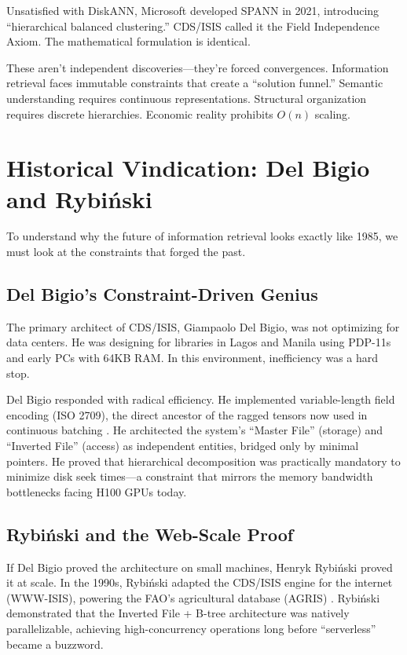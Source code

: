 \documentclass[manuscript,screen,review]{acmart}
\begin{document}
Unsatisfied with DiskANN, Microsoft developed SPANN in 2021, introducing ``hierarchical balanced clustering.'' CDS/ISIS called it the Field Independence Axiom. The mathematical formulation is identical.

These aren't independent discoveries---they're forced convergences. Information retrieval faces immutable constraints that create a ``solution funnel.'' Semantic understanding requires continuous representations. Structural organization requires discrete hierarchies. Economic reality prohibits $O(n)$ scaling.

\section{Historical Vindication: Del Bigio and Rybiński}

To understand why the future of information retrieval looks exactly like 1985, we must look at the constraints that forged the past.

\subsection{Del Bigio's Constraint-Driven Genius}

The primary architect of CDS/ISIS, Giampaolo Del Bigio, was not optimizing for data centers. He was designing for libraries in Lagos and Manila using PDP-11s and early PCs with 64KB RAM. In this environment, inefficiency was a hard stop.

Del Bigio responded with radical efficiency. He implemented variable-length field encoding (ISO 2709), the direct ancestor of the ragged tensors now used in continuous batching \cite{iso2008}. He architected the system's ``Master File'' (storage) and ``Inverted File'' (access) as independent entities, bridged only by minimal pointers. He proved that hierarchical decomposition was practically mandatory to minimize disk seek times---a constraint that mirrors the memory bandwidth bottlenecks facing H100 GPUs today.

\subsection{Rybiński and the Web-Scale Proof}

If Del Bigio proved the architecture on small machines, Henryk Rybiński proved it at scale. In the 1990s, Rybiński adapted the CDS/ISIS engine for the internet (WWW-ISIS), powering the FAO's agricultural database (AGRIS) \cite{rybinski1999}. Rybiński demonstrated that the Inverted File + B-tree architecture was natively parallelizable, achieving high-concurrency operations long before ``serverless'' became a buzzword.
\end{document}
